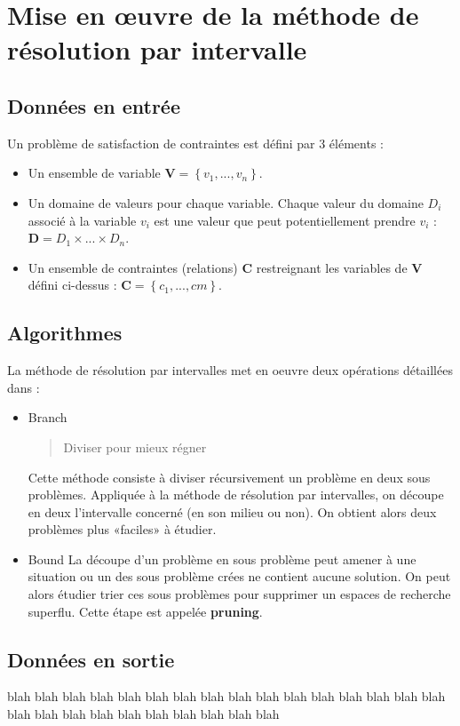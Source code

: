 \section{Mise en œuvre de la méthode de résolution par intervalle}


\subsection{Données en entrée}
Un problème de satisfaction de contraintes est défini par 3 éléments : 
\begin{itemize}
\item
Un ensemble de variable $\mathbf{V} = \left\{ v_1,...,v_n \right\}$.
\item
Un domaine de valeurs pour chaque variable. Chaque valeur du domaine $D_i$ associé à la variable $v_i$ est une valeur que peut potentiellement prendre $v_i$ : $\mathbf{D} = D_1 \times ... \times D_n $.
\item
Un ensemble de contraintes (relations) $\mathbf{C}$ restreignant les variables de $\mathbf{V}$ défini ci-dessus :  $\mathbf{C} = \left\{c_1,...,cm\right\}$. 
\end{itemize}

\subsection{Algorithmes}
La méthode de résolution par intervalles met en oeuvre deux opérations détaillées dans \cite{Neumaier}: 
\begin{itemize}
\item{Branch}
\begin{quote}Diviser pour mieux régner\end{quote} Cette méthode consiste à diviser récursivement un problème en deux sous problèmes. Appliquée à la méthode de résolution par intervalles, on découpe en deux l'intervalle concerné (en son milieu ou non). On obtient alors deux problèmes plus «faciles» à étudier.
\item{Bound}
La découpe d'un problème en sous problème peut amener à une situation ou un des sous problème crées ne contient aucune solution. On peut alors étudier trier ces sous problèmes pour supprimer un espaces de recherche superflu. Cette étape est appelée \textbf{pruning}.
\end{itemize}

\subsection{Données en sortie}
 blah blah blah blah blah blah blah blah blah blah blah blah blah blah blah blah blah blah blah blah blah blah blah blah blah blah
